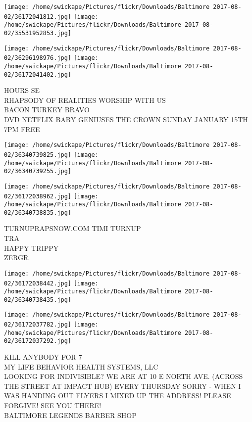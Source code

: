 \documentclass[10pt,letterpaper]{article}
\begin{document}
\texttt{[image: /home/swickape/Pictures/flickr/Downloads/Baltimore 2017-08-02/36172041812.jpg]}
\texttt{[image: /home/swickape/Pictures/flickr/Downloads/Baltimore 2017-08-02/35531952853.jpg]}

\texttt{[image: /home/swickape/Pictures/flickr/Downloads/Baltimore 2017-08-02/36296198976.jpg]}
\texttt{[image: /home/swickape/Pictures/flickr/Downloads/Baltimore 2017-08-02/36172041402.jpg]}

HOURS SE\\
RHAPSODY OF REALITIES WORSHIP WITH US\\
BACON TURKEY BRAVO\\
DVD NETFLIX BABY GENIUSES THE CROWN SUNDAY JANUARY 15TH 7PM FREE\\
\pagebreak

\texttt{[image: /home/swickape/Pictures/flickr/Downloads/Baltimore 2017-08-02/36340739825.jpg]}
\texttt{[image: /home/swickape/Pictures/flickr/Downloads/Baltimore 2017-08-02/36340739255.jpg]}

\texttt{[image: /home/swickape/Pictures/flickr/Downloads/Baltimore 2017-08-02/36172038962.jpg]}
\texttt{[image: /home/swickape/Pictures/flickr/Downloads/Baltimore 2017-08-02/36340738835.jpg]}

TURNUPRAPSNOW.COM TIMI TURNUP\\
TRA\\
HAPPY TRIPPY\\
ZERGR\\
\pagebreak

\texttt{[image: /home/swickape/Pictures/flickr/Downloads/Baltimore 2017-08-02/36172038442.jpg]}
\texttt{[image: /home/swickape/Pictures/flickr/Downloads/Baltimore 2017-08-02/36340738435.jpg]}

\texttt{[image: /home/swickape/Pictures/flickr/Downloads/Baltimore 2017-08-02/36172037782.jpg]}
\texttt{[image: /home/swickape/Pictures/flickr/Downloads/Baltimore 2017-08-02/36172037292.jpg]}

KILL ANYBODY FOR 7\\
MY LIFE BEHAVIOR HEALTH SYSTEMS, LLC\\
LOOKING FOR INDIVISIBLE?  WE ARE AT 10 E NORTH AVE. (ACROSS THE STREET AT IMPACT HUB) EVERY THURSDAY SORRY  {-} WHEN I WAS HANDING OUT FLYERS I MIXED UP THE ADDRESS!  PLEASE FORGIVE!  SEE YOU THERE!\\
BALTIMORE LEGENDS BARBER SHOP\\
\pagebreak
\end{document}
